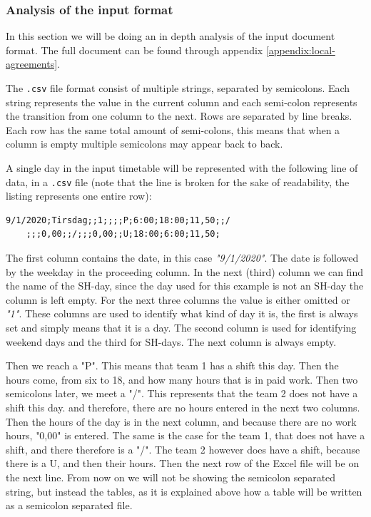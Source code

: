 \subsubsection{Analysis of the input format}
\label{sec:input-analysis}
In this section we will be doing an in depth analysis of the input document format. The full document can be found through appendix \ref{appendix:local-agreements}.

The \verb|.csv| file format consist of multiple strings, separated by semicolons. Each string represents the value in the current column and each semi-colon represents the transition from one column to the next. Rows are separated by line breaks. Each row has the same total amount of semi-colons, this means that when a column is empty multiple semicolons may appear back to back.

A single day in the input timetable will be represented with the following line of data, in a \verb|.csv| file (note that the line is broken for the sake of readability, the listing represents one entire row):

\begin{lstlisting}[caption={Example row.}]
    9/1/2020;Tirsdag;;1;;;;P;6:00;18:00;11,50;;/
    ;;;0,00;;/;;;0,00;;U;18:00;6:00;11,50;
\end{lstlisting}

The first column contains the date, in this case \textit{"9/1/2020"}. The date is followed by the weekday in the proceeding column. In the next (third) column we can find the name of the SH-day, since the day used for this example is not an SH-day the column is left empty. For the next three columns the value is either omitted or \textit{"1"}. These columns are used to identify what kind of day it is, the first is always set and simply means that it is a day. The second column is used for identifying weekend days and the third for SH-days. The next column is always empty.

Then we reach a "P". This means that \primo team 1 has a shift this day. Then the hours come, from six to 18, and how many hours that is in paid work. Then two semicolons later, we meet a "/". This represents that the \primo team 2 does not have a shift this day. and therefore, there are no hours entered in the next two columns. Then the hours of the day is in the next column, and because there are no work hours, "0,00" is entered. The same is the case for the \ultimo team 1, that does not have a shift, and there therefore is a "/". The \ultimo team 2 however does have a shift, because there is a U, and then their hours. Then the next row of the Excel file will be on the next line. From now on we will not be showing the semicolon separated string, but instead the tables, as it is explained above how a table will be written as a semicolon separated file.

